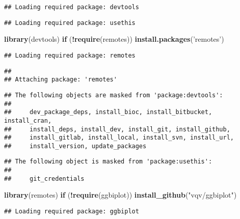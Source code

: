 \documentclass[]{article}
\newenvironment{Shaded}{\begin{snugshade}}{\end{snugshade}}
\newcommand{\ControlFlowTok}[1]{\textcolor[rgb]{0.13,0.29,0.53}{\textbf{#1}}}
\newcommand{\KeywordTok}[1]{\textcolor[rgb]{0.13,0.29,0.53}{\textbf{#1}}}
\newcommand{\NormalTok}[1]{#1}
\newcommand{\OperatorTok}[1]{\textcolor[rgb]{0.81,0.36,0.00}{\textbf{#1}}}
\newcommand{\StringTok}[1]{\textcolor[rgb]{0.31,0.60,0.02}{#1}}
\begin{document}
\begin{verbatim}
## Loading required package: devtools
\end{verbatim}

\begin{verbatim}
## Loading required package: usethis
\end{verbatim}

\begin{Shaded}
\begin{Highlighting}[]
\KeywordTok{library}\NormalTok{(devtools)}
\ControlFlowTok{if}\NormalTok{ (}\OperatorTok{!}\KeywordTok{require}\NormalTok{(remotes)) }\KeywordTok{install.packages}\NormalTok{(}\StringTok{'remotes'}\NormalTok{)}
\end{Highlighting}
\end{Shaded}

\begin{verbatim}
## Loading required package: remotes
\end{verbatim}

\begin{verbatim}
## 
## Attaching package: 'remotes'
\end{verbatim}

\begin{verbatim}
## The following objects are masked from 'package:devtools':
## 
##     dev_package_deps, install_bioc, install_bitbucket, install_cran,
##     install_deps, install_dev, install_git, install_github,
##     install_gitlab, install_local, install_svn, install_url,
##     install_version, update_packages
\end{verbatim}

\begin{verbatim}
## The following object is masked from 'package:usethis':
## 
##     git_credentials
\end{verbatim}

\begin{Shaded}
\begin{Highlighting}[]
\KeywordTok{library}\NormalTok{(remotes)}
\ControlFlowTok{if}\NormalTok{ (}\OperatorTok{!}\KeywordTok{require}\NormalTok{(ggbiplot)) }\KeywordTok{install_github}\NormalTok{(}\StringTok{"vqv/ggbiplot"}\NormalTok{)}
\end{Highlighting}
\end{Shaded}

\begin{verbatim}
## Loading required package: ggbiplot
\end{verbatim}
\end{document}
